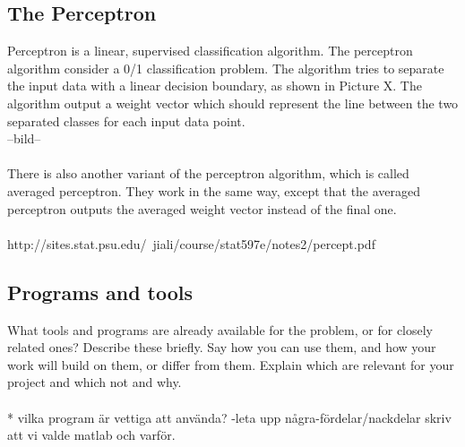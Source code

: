 \subsection{The Perceptron}
Perceptron is a linear, supervised classification algorithm. The perceptron algorithm consider a 0/1 classification problem. 
The algorithm tries to separate the input data with a linear decision boundary, as shown in Picture X. The algorithm output a weight vector which should represent the line between the two separated classes for each input data point. 
\\
--bild-- 
\\\\
There is also another variant of the perceptron algorithm, which is called averaged perceptron. They work in the same way, except that the averaged perceptron outputs the averaged weight vector instead of the final one.
\\\\
http://sites.stat.psu.edu/~jiali/course/stat597e/notes2/percept.pdf

\subsection{Programs and tools}
What tools and programs are already available for the problem, or for closely related ones?
Describe these briefly. Say how you can use them, and how your work will build on them, or differ from them. Explain which are relevant for your project and which not and why.
\\\\
* vilka program är vettiga att använda? -leta upp några-fördelar/nackdelar
skriv att vi valde matlab och varför.


